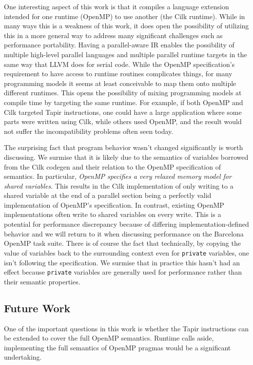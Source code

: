 \documentclass[sigconf]{acmart}
\begin{document}
One interesting aspect of this work is that it compiles a language extension
intended for one runtime (OpenMP) to use another (the Cilk runtime). While in
many ways this is a weakness of this work, it does open the possibility of
utilizing this in a more general way to address many significant challenges
such as performance portability. Having a parallel-aware IR enables the
possibility of multiple high-level parallel languages and multiple parallel
runtime targets in the same way that LLVM does for serial code. While the
OpenMP specification's requirement to have access to runtime routines
complicates things, for many programming models it seems at least conceivable
to map them onto multiple different runtimes. This opens the possibility of
mixing programming models at compile time by targeting the same runtime. For
example, if both OpenMP and Cilk targeted Tapir instructions, one could have a
large application where some parts were written using Cilk, while others used
OpenMP, and the result would not suffer the incompatibility problems often
seen today.

The surprising fact that program behavior wasn't changed significantly is worth
discussing. We surmise that it is likely due to the semantics of variables
borrowed from the Cilk codegen and their relation to the OpenMP specification
of semantics. In particular, \emph{OpenMP specifies a very relaxed memory model
for shared variables}. This results in the Cilk implementation of only writing
to a shared variable at the end of a parallel section being a perfectly valid
implementation of OpenMP's specification. In contrast, existing OpenMP
implementations often write to shared variables on every write. This is a
potential for performance discrepancy because of differing
implementation-defined behavior and we will return to it when discussing
performance on the Barcelona OpenMP task suite. There is of course the fact
that technically, by copying the value of variables back to the surrounding
context even for \texttt{private} variables, one isn't following the
specification. We surmise that in practice this hasn't had an effect because
\texttt{private} variables are generally used for performance rather than their
semantic properties. 

\subsection{Future Work} \label{Sec:Future}

One of the important questions in this work is whether the Tapir
instructions can be extended to cover the full OpenMP semantics.
Runtime
calls aside, implementing the full semantics of OpenMP pragmas would be a
significant undertaking. 
\end{document}
